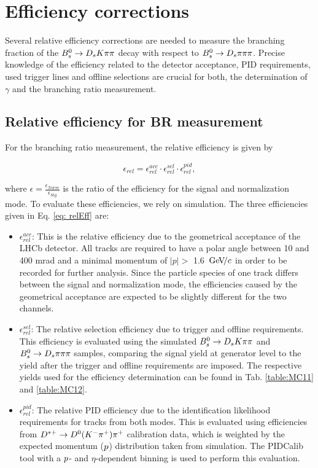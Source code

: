 \section{Efficiency corrections}
\label{sec: efficiency}

Several relative efficiency corrections are needed to measure the branching fraction of the ${{B}^0_{s}}\rightarrow{\ensuremath{{D}_{s}}}{\ensuremath{K}}{\ensuremath{\pi}}{\ensuremath{\pi}}$ decay with respect to ${{B}^0_{s}}\rightarrow{\ensuremath{{D}_{s}}}{\ensuremath{\pi}}{\ensuremath{\pi}}{\ensuremath{\pi}}$. Precise knowledge of the efficiency related to the detector acceptance, PID requirements, used trigger lines and offline selections are crucial for both, the determination of $\gamma$ and the branching ratio measurement.

\subsection{Relative efficiency for BR measurement}
For the branching ratio measurement, the relative efficiency is given by

\begin{equation} 
\epsilon_{rel} = \epsilon^{acc}_{rel}\cdot\epsilon^{sel}_{rel}\cdot\epsilon^{pid}_{rel},
\label{eq: relEff}
\end{equation}

where $\epsilon = \frac{\epsilon_{Norm}}{\epsilon_{Sig}}$ is the ratio of the efficiency for the signal and normalization mode. To evaluate these efficiencies, we rely on simulation. The three efficiencies given in Eq. \ref{eq: relEff} are:

\begin{itemize}

\item $\epsilon^{acc}_{rel}$: This is the relative efficiency due to the geometrical acceptance of the LHCb detector. All tracks are required to have a polar angle between 10 and 400 mrad and a minimal momentum of $|p| >$ 1.6 ${\mathrm{\,Ge\kern -0.1em V\!/}c}$ in order to be recorded for further analysis. 
Since the particle species of one track differs between the signal and normalization mode, the efficiencies caused by the geometrical acceptance are expected to be slightly different for the two channels.

\item $\epsilon^{sel}_{rel}$: The relative selection efficiency due to trigger and offline requirements. 
This efficiency is evaluated using the simulated ${{B}^0_{s}}\rightarrow{\ensuremath{{D}_{s}}}{\ensuremath{K}}{\ensuremath{\pi}}{\ensuremath{\pi}}$ and ${{B}^0_{s}}\rightarrow{\ensuremath{{D}_{s}}}{\ensuremath{\pi}}{\ensuremath{\pi}}{\ensuremath{\pi}}$ samples, 
comparing the signal yield at generator level to the yield after the trigger and offline requirements are imposed. 
The respective yields used for the efficiency determination can be found in Tab. \ref{table:MC11} and \ref{table:MC12}. 

\item $\epsilon^{pid}_{rel}$: The relative PID efficiency due to the identification likelihood requirements for tracks from both modes. This is evaluated using efficiencies from ${D}^{*+}\rightarrow D^{0}({{K}^-}{{\pi}^+}){{\pi}^+}$ calibration data, 
which is weighted by the expected momentum ($\mbox{$p$}$) distribution taken from simulation. The PIDCalib tool with a $\mbox{$p$}$- and $\eta$-dependent binning is used to perform this evaluation.

\end{itemize}

